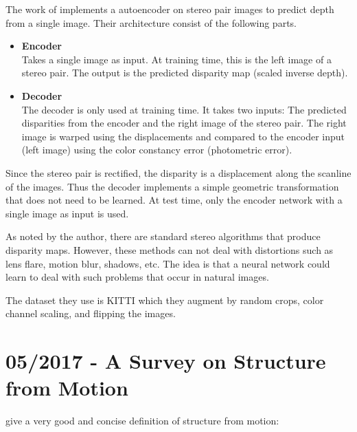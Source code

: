         The work of \citet{garg2016} implements a autoencoder on stereo pair images to predict depth from a single image.
        Their architecture consist of the following parts.
        \begin{itemize}
        	\item \textbf{Encoder}
        		\\
        		Takes a single image as input. 
        		At training time, this is the left image of a stereo pair.
        		The output is the predicted disparity map (scaled inverse depth).
        	\item \textbf{Decoder}
        		\\
        		The decoder is only used at training time.
        		It takes two inputs: The predicted disparities from the encoder and the right image of the stereo pair.
        		The right image is warped using the displacements and compared to the encoder input (left image) using the color constancy error (photometric error).
        \end{itemize}
        Since the stereo pair is rectified, the disparity is a displacement along the scanline of the images.
        Thus the decoder implements a simple geometric transformation that does not need to be learned.
        At test time, only the encoder network with a single image as input is used.
        
        As noted by the author, there are standard stereo algorithms that produce disparity maps.
        However, these methods can not deal with distortions such as lens flare, motion blur, shadows, etc.
        The idea is that a neural network could learn to deal with such problems that occur in natural images.
        
        The dataset they use is {KITTI} which they augment by random crops, color channel scaling, and flipping the images.
        
        \section{05/2017 - A Survey on Structure from Motion}
        
        	\citet{survey2017} give a very good and concise definition of structure from motion:
        	
        	
